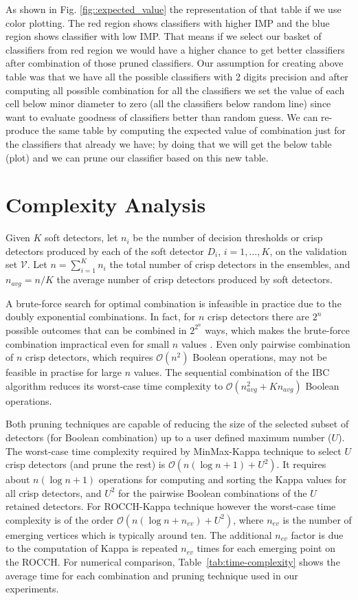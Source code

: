 As shown in Fig. \ref{fig::expected_value}  the representation of that table if we use color plotting. The red region shows classifiers with higher IMP and the blue region shows classifier with low IMP. That means if we select our basket of classifiers from red region we would have a higher chance to get better classifiers after combination of those pruned classifiers. Our assumption for creating above table was that we have all the possible classifiers with 2 digits precision and after computing all possible combination for all the classifiers we set the value of each cell below minor diameter to zero (all the classifiers below random line) since want to evaluate goodness of classifiers better than random guess.
We can re-produce the same table by computing the expected value of combination just for the classifiers that already we have; by doing that we will get the below table (plot) and we can prune our classifier based on this new table.

\section{Complexity Analysis}
\label{sub:complexity}

Given $K$ soft detectors, let $n_i$ be the number of decision thresholds or crisp detectors produced by each of the soft detector $D_i$, $i=1,\ldots, K$, on the validation set $\mathcal{V}$.
Let $n=\sum_{i=1}^{K} n_i$ the total number of crisp detectors in the ensembles, and $n_{avg} = n/K$ the average number of crisp detectors produced by soft detectors.

A brute-force search for optimal combination is infeasible in practice due to the doubly exponential combinations.
In fact, for $n$ crisp detectors there are $2^n$ possible outcomes that can be combined in $2^{2^n}$ ways, which makes the brute-force combination impractical even for small $n$ values \cite{Barreno2008}.
Even only pairwise combination of $n$ crisp detectors, which requires $\mathcal{O}(n^2)$ Boolean operations, may not be feasible in practise for large $n$ values.
The sequential combination of the IBC algorithm reduces its worst-case time complexity to $\mathcal{O}(n_{avg}^2 + Kn_{avg})$ Boolean operations.

Both pruning techniques are capable of reducing the size of the selected subset of detectors (for Boolean combination) up to a user defined maximum number ($U$).
The worst-case time complexity required by MinMax-Kappa technique to select $U$ crisp detectors (and prune the rest) is $\mathcal{O}(n(\log n + 1) + U^2)$.
It requires about $n(\log n + 1)$ operations for computing and sorting the Kappa values for all crisp detectors, and $U^2$ for the pairwise Boolean combinations of the $U$ retained detectors.
For ROCCH-Kappa technique however the worst-case time complexity is of the order $\mathcal{O}(n(\log n +n_{ev}) + U^2)$, where $n_{ev}$ is the number of emerging vertices which is typically around ten.
The additional $n_{ev}$ factor is due to the computation of Kappa is repeated $n_{ev}$ times for each emerging point on the ROCCH.
For numerical comparison, Table~\ref{tab:time-complexity} shows the average time for each combination and pruning technique used in our experiments.


